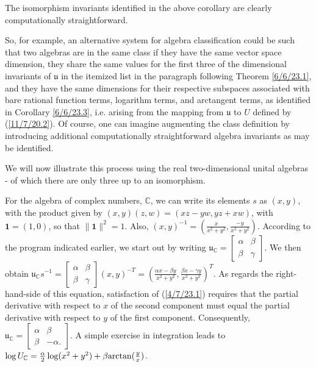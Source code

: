 \documentclass{amsart}
\numberwithin{equation}{section}
\theoremstyle{definition}
\numberwithin{theorem}{section}
\begin{document}
The isomorphism invariants identified in the above corollary are clearly computationally straightforward.

So, for example, an alternative system for algebra classification could be such that two algebras are in the same class if they have the same vector space dimension, they share the same values for the first three of the dimensional invariants of $\mathfrak{u}$ in the itemized list in the paragraph following Theorem \ref{6/6/23.1}, and they have the same dimensions for their respective subspaces associated with bare rational function terms, logarithm terms, and arctangent terms, as identified in Corollary \ref{6/6/23.3}, i.e. arising from the mapping from $\mathfrak{u}$ to $ U$ defined by (\ref{11/7/20.2}).  
Of course, one can imagine augmenting the class definition by introducing additional computationally straightforward algebra invariants as may be identified.  

We will now illustrate this process using the real two-dimensional unital algebras - of which there are only three up to an isomorphism.

For the algebra of complex numbers, $\mathbb{C}$, we can write its elements $s$ as $(x,y)$, with the product given by $(x,y)(z,w) = (xz-yw, yz+xw)$, with $\mathbf{1}=(1,0)$, so that $\|\mathbf{1}\|^2=1$.  Also, $(x,y)^{-1} = (\frac{x}{x^2+y^2},\frac{-y}{x^2+y^2})$.  According to the program indicated earlier, we start out by writing  $\mathfrak{u}_\mathbb{C} = \left[\begin{array}{ccc}
 \alpha & \beta   \\ 
 \beta & \gamma    
\end{array}\right]$.  We then obtain  $\mathfrak{u}_\mathbb{C}s^{-1} = \left[\begin{array}{ccc}
 \alpha & \beta   \\ 
 \beta & \gamma    
\end{array}\right](x,y)^{-T} = \left(\frac{\alpha x - \beta y}{x^2+y^2}, \frac{\beta x - \gamma y}{x^2+y^2}\right)^T$.  As regards the right-hand-side of this equation, satisfaction of (\ref{4/7/23.1}) requires that the partial derivative with respect to $x$ of the second component must equal the partial derivative with respect to $y$ of the first component.  Consequently, $\mathfrak{u}_{\mathbb{C}} = \left[\begin{array}{ccc}
 \alpha & \beta   \\ 
 \beta & -\alpha.    
\end{array}\right]$.  A simple exercise in integration leads to $\log  U_{\mathbb{C}} = \frac{\alpha}{2}\log(x^2+y^2) + \beta{\rm arctan}(\frac{y}{x})$.
\end{document}
